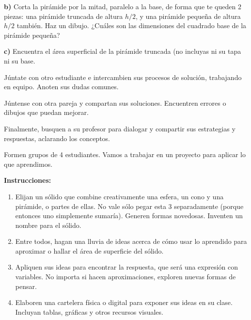 \documentclass[12pt,a4paper]{article}
\begin{document}
\textbf{b)} Corta la pirámide por la mitad, paralelo a la base, de forma que te queden 2 piezas: una pirámide truncada de altura $h/2$, y una pirámide pequeña de altura $h/2$ también. Haz un dibujo. ¿Cuáles son las dimensiones del cuadrado base de la pirámide pequeña?

\textbf{c)} Encuentra el área superficial de la pirámide truncada (no incluyas ni su tapa ni su base.

Júntate con otro estudiante e intercambien sus procesos de solución, trabajando en equipo. Anoten sus dudas comunes.

Júntense con otra pareja y compartan sus soluciones. Encuentren errores o dibujos que puedan mejorar.

Finalmente, busquen a su profesor para dialogar y compartir sus estrategias y respuestas, aclarando los conceptos.

\begin{tcolorbox}[colback=fondorosa, colframe=rojoclaro, title=\textbf{PROYECTO GRUPAL - APLIQUEMOS LO APRENDIDO}, breakable]
Formen grupos de 4 estudiantes. Vamos a trabajar en un proyecto para aplicar lo que aprendimos.

\textbf{Instrucciones:}

\begin{enumerate}[nosep]
    \item Elijan un sólido que combine creativamente una esfera, un cono y una pirámide, o partes de ellas. No vale sólo pegar esta 3 separadamente (porque entonces uno simplemente sumaría). Generen formas novedosas. Inventen un nombre para el sólido.

    \item Entre todos, hagan una lluvia de ideas acerca de cómo usar lo aprendido para aproximar o hallar el área de superficie del sólido.

    \item Apliquen sus ideas para encontrar la respuesta, que será una expresión con variables. No importa si hacen aproximaciones, exploren nuevas formas de pensar.

    \item Elaboren una cartelera física o digital para exponer sus ideas en su clase. Incluyan tablas, gráficas y otros recursos visuales.
\end{enumerate}
\end{tcolorbox}

\vspace{4mm}

\end{document}

